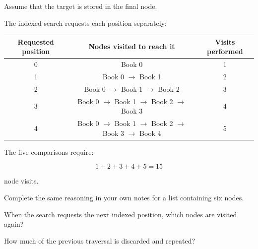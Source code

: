 \documentclass{csc2059practical}
\begin{document}
Assume that the target is stored in the final node.

The indexed search requests each position separately:

\begin{center}
\begin{tabular}{c c c}
\toprule
\textbf{Requested position} &
\textbf{Nodes visited to reach it} &
\textbf{Visits performed} \\
\midrule
0 & Book 0 & 1 \\
1 & Book 0 $\rightarrow$ Book 1 & 2 \\
2 & Book 0 $\rightarrow$ Book 1 $\rightarrow$ Book 2 & 3 \\
3 & Book 0 $\rightarrow$ Book 1 $\rightarrow$ Book 2
  $\rightarrow$ Book 3 & 4 \\
4 & Book 0 $\rightarrow$ Book 1 $\rightarrow$ Book 2
  $\rightarrow$ Book 3 $\rightarrow$ Book 4 & 5 \\
\bottomrule
\end{tabular}
\end{center}

The five comparisons require:

\[
1 + 2 + 3 + 4 + 5 = 15
\]

node visits.

Complete the same reasoning in your own notes for a list containing six nodes.


\begin{reflectionbox}
When the search requests the next indexed position, which nodes are visited
again?

How much of the previous traversal is discarded and repeated?
\end{reflectionbox}
\end{document}
